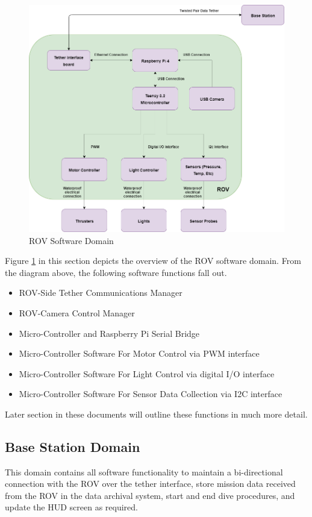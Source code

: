 \documentclass{scrreprt}
\begin{document}
\begin{figure}[!ht]
    \centering
    \includegraphics[scale=0.55]{ROVDomainSoftware.png}
    \caption{ROV Software Domain}
    \label{fig:ROV Software Domain}
\end{figure}
\FloatBarrier

Figure \ref{fig:ROV Software Domain} in this section depicts the overview of the ROV software domain. From the diagram above, the following software functions fall out.

\begin{itemize}
    \item ROV-Side Tether Communications Manager
    \item ROV-Camera Control Manager
    \item Micro-Controller and Raspberry Pi Serial Bridge
    \item Micro-Controller Software For Motor Control via PWM interface
    \item Micro-Controller Software For Light Control via digital I/O interface
    \item Micro-Controller Software For Sensor Data Collection via I2C interface
\end{itemize}
Later section in these documents will outline these functions in much more detail.

\subsection{Base Station Domain}
This domain contains all software functionality to maintain a bi-directional connection with the ROV over the tether interface, store mission data received from the ROV in the data archival system, start and end dive procedures, and update the HUD screen as required. 
\end{document}
